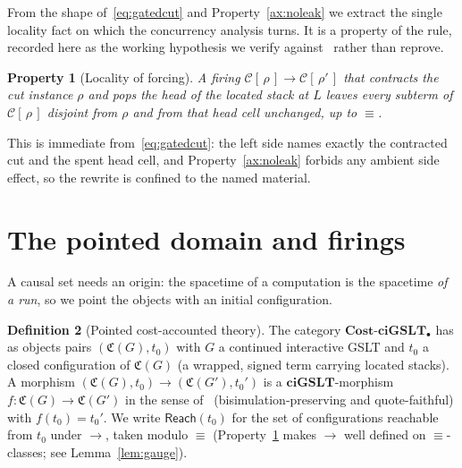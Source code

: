 \documentclass[11pt]{article}
\theoremstyle{definition}
\newtheorem{definition}{Definition}[section]
\theoremstyle{plain}
\newtheorem{axiomx}[definition]{Property}
\newcommand{\ciGSLT}{\mathbf{ciGSLT}}
\newcommand{\CostCp}{\mathbf{Cost}\text{-}\ciGSLT_{\bullet}}
\newcommand{\Cost}{\mathfrak{C}}
\newcommand{\Seq}{\equiv}
\newcommand{\red}{\longrightarrow}
\newcommand{\reach}{\mathsf{Reach}}
\theoremstyle{remark}
\begin{document}
From the shape of~\eqref{eq:gatedcut} and Property~\ref{ax:noleak} we
extract the single locality fact on which the concurrency analysis turns.
It is a property of the rule, recorded here as the working hypothesis we
verify against~\cite{CostNote} rather than reprove.

\begin{axiomx}[Locality of forcing]
\label{ax:loc}
A firing $\mathcal{C}[\,\rho\,]\red \mathcal{C}[\,\rho'\,]$ that
contracts the cut instance $\rho$ and pops the head of the located stack
at $L$ leaves every subterm of $\mathcal{C}[\,\rho\,]$ disjoint from
$\rho$ and from that head cell unchanged, up to $\Seq$.
\end{axiomx}

\noindent
This is immediate from~\eqref{eq:gatedcut}: the left side names exactly
the contracted cut and the spent head cell, and Property~\ref{ax:noleak}
forbids any ambient side effect, so the rewrite is confined to the named
material.

\section{The pointed domain and firings}
\label{sec:domain}

A causal set needs an origin: the spacetime of a computation is the
spacetime \emph{of a run}, so we point the objects with an initial
configuration.

\begin{definition}[Pointed cost-accounted theory]
\label{def:pointed}
The category $\CostCp$ has as objects pairs $(\Cost(G), t_0)$ with $G$ a
continued interactive GSLT and $t_0$ a closed configuration of
$\Cost(G)$ (a wrapped, signed term carrying located stacks). A morphism
$(\Cost(G), t_0) \to (\Cost(G'), t_0')$ is a $\ciGSLT$-morphism
$f : \Cost(G) \to \Cost(G')$ in the sense of~\cite{CostNote}
(bisimulation-preserving and quote-faithful) with $f(t_0)=t_0'$. We
write $\reach(t_0)$ for the set of configurations reachable from $t_0$
under $\red$, taken modulo $\Seq$ (Property~\ref{ax:loc} makes $\red$
well defined on $\Seq$-classes; see Lemma~\ref{lem:gauge}).
\end{definition}
\end{document}
